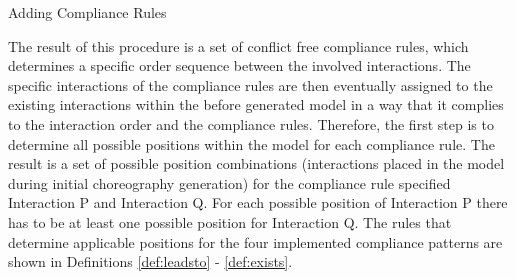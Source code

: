 \begin{algorithm}[H]
\small
\DontPrintSemicolon
\SetAlgoLined
{}
\caption{Adding Compliance Rules}
\label{alg:conflictCheck}
\end{algorithm}
\vspace{0.5cm}
The result of this procedure is a set of conflict free compliance rules, which determines a specific order sequence between the involved interactions. The specific interactions of the compliance rules are then eventually assigned to the existing interactions within the before generated model in a way that it complies to the interaction order and the compliance rules. Therefore, the first step is to determine all possible positions within the model for each compliance rule. The result is a set of possible position combinations (interactions placed in the model during initial choreography generation) for the compliance rule specified Interaction P and Interaction Q. For each possible position of Interaction P there has to be at least one possible position for Interaction Q. The rules that determine applicable positions for the four implemented compliance patterns are shown in Definitions \ref{def:leadsto} - \ref{def:exists}. \\

